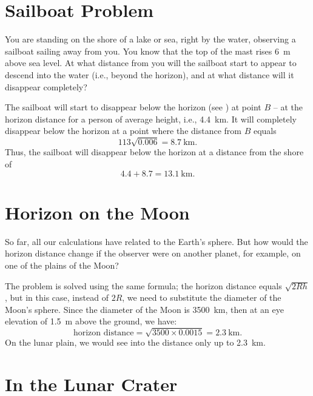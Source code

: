 \section{Sailboat Problem}
\label{sec-6.9}

\ques You are standing on the shore of a lake or sea, right by the water, observing a sailboat sailing away from you. You know that the top of the mast rises \SI{6}{\meter} above sea level. At what distance from you will the sailboat start to appear to descend into the water (i.e., beyond the horizon), and at what distance will it disappear completely?

\ans The sailboat will start to disappear below the horizon (see ) at point $B$ -- at the horizon distance for a person of average height, i.e., \SI{4.4}{\kilo\meter}. It will completely disappear below the horizon at a point where the distance from $B$ equals 
\begin{equation*}%
113\sqrt{0.006} = \SI{8.7}{\kilo\meter}. 
\end{equation*}
Thus, the sailboat will disappear below the horizon at a distance from the shore of 
\begin{equation*}%
4.4 + 8.7 = \SI{13.1}{\kilo\meter}. 
\end{equation*}


\section{Horizon on the Moon}
\label{sec-6.10}

\ques So far, all our calculations have related to the Earth's sphere. But how would the horizon distance change if the observer were on another planet, for example, on one of the plains of the Moon?


\ans The problem is solved using the same formula; the horizon distance equals $\sqrt{2Rh}$, but in this case, instead of $2R$, we need to substitute the diameter of the Moon's sphere. Since the diameter of the Moon is \SI{3500}{\kilo\meter}, then at an eye elevation of \SI{1.5}{\meter} above the ground, we have:
\begin{equation*}%
\text{horizon distance} = \sqrt{3500 \times 0.0015} = \SI{2.3}{\kilo\meter}.
\end{equation*}
On the lunar plain, we would see into the distance only up to \SI{2.3}{\kilo\meter}.


\section{In the Lunar Crater}
\label{sec-6.11}

